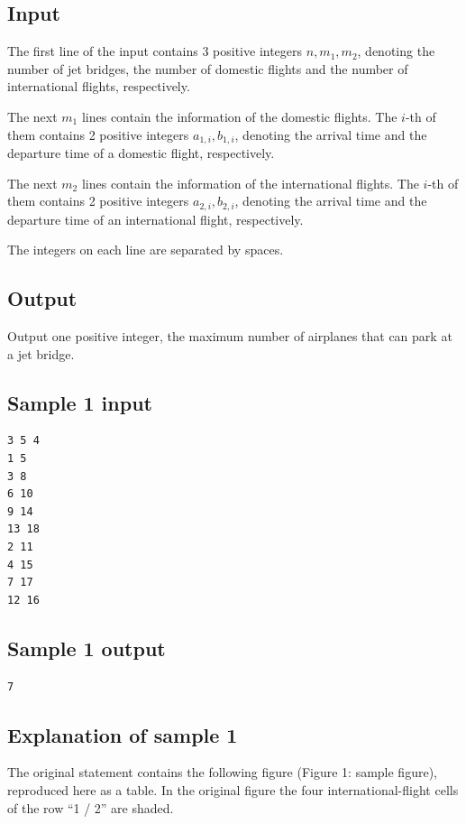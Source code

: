\documentclass[11pt]{article}
\begin{document}
\subsection*{Input}

The first line of the input contains 3 positive integers $n, m_1, m_2$,
denoting the number of jet bridges, the number of domestic flights and the
number of international flights, respectively.

The next $m_1$ lines contain the information of the domestic flights.
The $i$-th of them contains 2 positive integers $a_{1,i}, b_{1,i}$,
denoting the arrival time and the departure time of a domestic flight,
respectively.

The next $m_2$ lines contain the information of the international flights.
The $i$-th of them contains 2 positive integers $a_{2,i}, b_{2,i}$,
denoting the arrival time and the departure time of an international
flight, respectively.

The integers on each line are separated by spaces.

\subsection*{Output}

Output one positive integer, the maximum number of airplanes that can park
at a jet bridge.

\subsection*{Sample 1 input}

\begin{verbatim}
3 5 4
1 5
3 8
6 10
9 14
13 18
2 11
4 15
7 17
12 16
\end{verbatim}

\subsection*{Sample 1 output}

\begin{verbatim}
7
\end{verbatim}

\subsection*{Explanation of sample 1}

The original statement contains the following figure (Figure 1: sample
figure), reproduced here as a table.
In the original figure the four international-flight cells of the row
``1 / 2'' are shaded.
\end{document}
